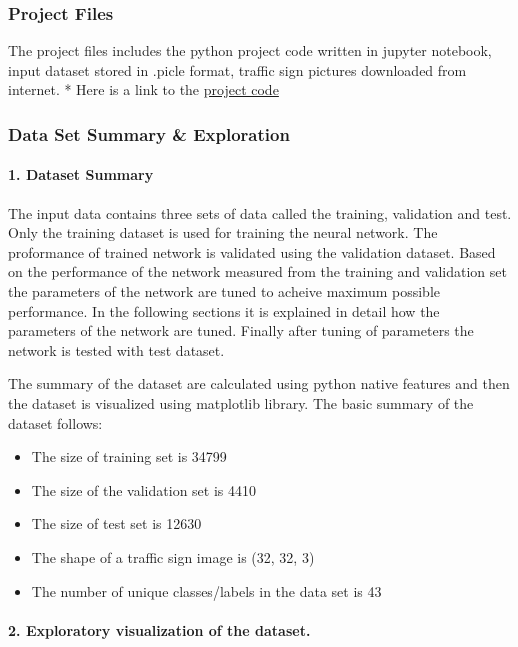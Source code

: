 \documentclass[11pt]{article}
\providecommand{\tightlist}{%
      \setlength{\itemsep}{0pt}\setlength{\parskip}{0pt}}
\begin{document}
\subsubsection{Project Files}\label{project-files}

The project files includes the python project code written in jupyter
notebook, input dataset stored in .picle format, traffic sign pictures
downloaded from internet. * Here is a link to the
\href{https://github.com/udacity/CarND-Traffic-Sign-Classifier-Project/blob/master/Traffic_Sign_Classifier.ipynb}{project
code}

\subsubsection{Data Set Summary \&
Exploration}\label{data-set-summary-exploration}

\paragraph{1. Dataset Summary}\label{dataset-summary}

The input data contains three sets of data called the training,
validation and test. Only the training dataset is used for training the
neural network. The proformance of trained network is validated using
the validation dataset. Based on the performance of the network measured
from the training and validation set the parameters of the network are
tuned to acheive maximum possible performance. In the following sections
it is explained in detail how the parameters of the network are tuned.
Finally after tuning of parameters the network is tested with test
dataset.

The summary of the dataset are calculated using python native features
and then the dataset is visualized using matplotlib library. The basic
summary of the dataset follows:

\begin{itemize}
\tightlist
\item
  The size of training set is 34799
\item
  The size of the validation set is 4410
\item
  The size of test set is 12630
\item
  The shape of a traffic sign image is (32, 32, 3)
\item
  The number of unique classes/labels in the data set is 43
\end{itemize}

\paragraph{2. Exploratory visualization of the
dataset.}\label{exploratory-visualization-of-the-dataset.}
\end{document}
